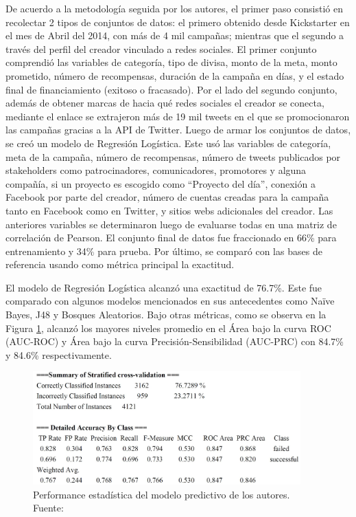 De acuerdo a la metodología seguida por los autores, el primer paso consistió en recolectar 2 tipos de conjuntos de datos: el primero obtenido desde Kickstarter en el mes de Abril del 2014, con más de 4 mil campañas; mientras que el segundo a través del perfil del creador vinculado a redes sociales. El primer conjunto comprendió las variables de categoría, tipo de divisa, monto de la meta, monto prometido, número de recompensas, duración de la campaña en días, y el estado final de financiamiento (exitoso o fracasado). Por el lado del segundo conjunto, además de obtener marcas de hacia qué redes sociales el creador se conecta, mediante el enlace se extrajeron más de 19 mil tweets en el que se promocionaron las campañas gracias a la API de Twitter. Luego de armar los conjuntos de datos, se creó un modelo de Regresión Logística. Este usó las variables de categoría, meta de la campaña, número de recompensas, número de tweets publicados por stakeholders como patrocinadores, comunicadores, promotores y alguna compañía, si un proyecto es escogido como “Proyecto del día”, conexión a Facebook por parte del creador, número de cuentas creadas para la campaña tanto en Facebook como en Twitter, y sitios webs adicionales del creador. Las anteriores variables se determinaron luego de evaluarse todas en una matriz de correlación de Pearson. El conjunto final de datos fue fraccionado en 66\% para entrenamiento y 34\% para prueba. Por último, se comparó con las bases de referencia usando como métrica principal la exactitud.

El modelo de Regresión Logística alcanzó una exactitud de 76.7\%. Este fue comparado con algunos modelos mencionados en sus antecedentes como Naïve Bayes, J48 y Bosques Aleatorios. Bajo otras métricas, como se observa en la Figura \ref{2:fig120}, alcanzó los mayores niveles promedio en el Área bajo la curva ROC (AUC-ROC) y Área bajo la curva Precisión-Sensibilidad (AUC-PRC) con 84.7\% y 84.6\% respectivamente.

\begin{figure}[!ht]
	\begin{center}
		\includegraphics[width=0.92\textwidth]{2/figures/kaur2017.jpg}
		\caption[Performance estadística del modelo predictivo de los autores]{Performance estadística del modelo predictivo de los autores.\\
			Fuente: \cite{pr_kaur2017socmedcrowd}}
		\label{2:fig120}
	\end{center}
\end{figure}

